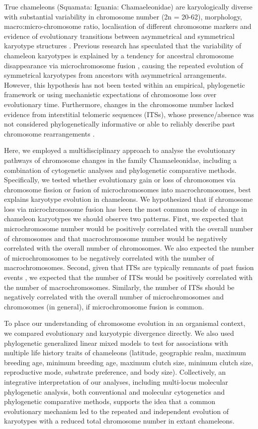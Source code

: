 \documentclass[a4paper, 12pt]{article}
\begin{document}
True chameleons (Squamata: Iguania: Chamaeleonidae) are karyologically diverse with substantial variability in chromosome number (2n = 20-62), morphology, macro:micro-chromosome ratio, localisation of different chromosome markers and evidence of evolutionary transitions between asymmetrical and symmetrical karyotype structures \citep{rovatsos2017evolution,nielsen2018dynamic}.
Previous research has speculated that the variability of chameleon karyotypes is explained by a tendency for ancestral chromosome disappearance via microchromosome fusion \citep{rovatsos2017evolution}, causing the repeated evolution of symmetrical karyotypes from ancestors with asymmetrical arrangements. 
However, this hypothesis has not been tested within an empirical, phylogenetic framework or using mechanistic expectations of chromosome loss over evolutionary time. 
Furthermore, changes in the chromosome number lacked evidence from interstitial telomeric sequences (ITSs), whose presence/absence was not considered phylogenetically informative or able to reliably describe past chromosome rearrangements \citep{rovatsos2017evolution}.

Here, we employed a multidisciplinary approach to analyse the evolutionary pathways of chromosome changes in the family Chamaeleonidae, including a combination of cytogenetic analyses and phylogenetic comparative methods. 
Specifically, we tested whether evolutionary gain or loss of chromosomes via chromosome fission or fusion of microchromosomes into macrochromosomes, best explains karyotype evolution in chameleons. 
We hypothesized that if chromosome loss via microchromosome fusion has been the most common mode of change in chameleon karyotypes we should observe two patterns. 
First, we expected that microchromosome number would be positively correlated with the overall number of chromosomes and that macrochromosome number would be negatively correlated with the overall number of chromosomes. 
We also expected the number of microchromosomes to be negatively correlated with the number of macrochromosomes. 
Second, given that ITSs are typically remnants of past fusion events \citep{bolzan2017interstitial}, we expected that the number of ITSs would be positively correlated with the number of macrochromosomes. 
Similarly, the number of ITSs should be negatively correlated with the overall number of microchromosomes and chromosomes (in general), if microchromosome fusion is common. 

To place our understanding of chromosome evolution in an organismal context, we compared evolutionary and karyotypic divergence directly. 
We also used phylogenetic generalized linear mixed models to test for associations with multiple life history traits of chameleons (latitude, geographic realm, maximum breeding age, minimum breeding age, maximum clutch size, minimum clutch size, reproductive mode, substrate preference, and body size). 
Collectively, an integrative interpretation of our analyses, including multi-locus molecular phylogenetic analysis, both conventional and molecular cytogenetics and phylogenetic comparative methods, supports the idea that a common evolutionary mechanism led to the repeated and independent evolution of karyotypes with a reduced total chromosome number in extant chameleons.
\end{document}
